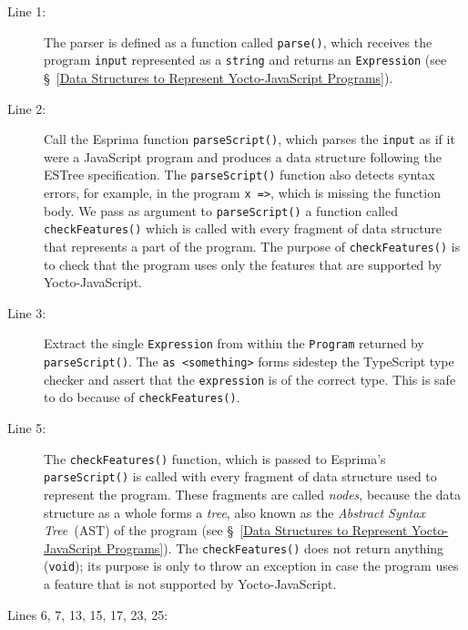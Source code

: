 \documentclass[12pt, oneside]{book}
\begin{document}
\begin{description}
\item [Line 1:]

The parser is defined as a function called \texttt{parse()}, which receives the program \texttt{input} represented as a \texttt{string} and returns an \texttt{Expression} (see §~\ref{Data Structures to Represent Yocto-JavaScript Programs}).

\item [Line 2:]

Call the Esprima function \texttt{parseScript()}, which parses the \texttt{input} as if it were a JavaScript program and produces a data structure following the ESTree specification. The \texttt{parseScript()} function also detects syntax errors, for example, in the program \texttt{x =>}, which is missing the function body. We pass as argument to \texttt{parseScript()} a function called \texttt{checkFeatures()} which is called with every fragment of data structure that represents a part of the program. The purpose of \texttt{checkFeatures()} is to check that the program uses only the features that are supported by Yocto-JavaScript.

\item [Line 3:]

Extract the single \texttt{Expression} from within the \texttt{Program} returned by \texttt{parseScript()}. The \texttt{as <something>} forms sidestep the TypeScript type checker and assert that the \texttt{expression} is of the correct type. This is safe to do because of \texttt{checkFeatures()}.

\item [Line 5:]

The \texttt{checkFeatures()} function, which is passed to Esprima’s \texttt{parseScript()} is called with every fragment of data structure used to represent the program. These fragments are called \emph{nodes}, because the data structure as a whole forms a \emph{tree}, also known as the \emph{Abstract Syntax Tree}~(AST) of the program (see §~\ref{Data Structures to Represent Yocto-JavaScript Programs}). The \texttt{checkFeatures()} does not return anything (\texttt{void}); its purpose is only to throw an exception in case the program uses a feature that is not supported by Yocto-JavaScript.

\item [Lines 6, 7, 13, 15, 17, 23, 25:]


\end{description}
\end{document}

